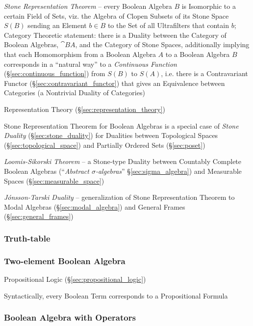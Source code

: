 \emph{Stone Representation Theorem} -- every Boolean Algebra $B$ is Isomorphic
to a certain Field of Sets, viz. the Algebra of Clopen Subsets of its Stone
Space $\xspace{S}(B)$ sending an Element $b \in B$ to the Set of all
Ultrafilters that contain $b$; Category Theoretic statement: there is a Duality
between the Category of Boolean Algebras, $\cat{BA}$, and the Category of Stone
Spaces, additionally implying that each Homomorphism from a Boolean Algebra $A$
to a Boolean Algebra $B$ corresponds in a ``natural way'' to a \emph{Continuous
  Function} (\S\ref{sec:continuous_function}) from $S(B)$ to $S(A)$, i.e. there
is a Contravariant Functor (\S\ref{sec:contravariant_functor}) that gives an
Equivalence between Categories (a Nontrivial Duality of Categories)

\fist Representation Theory (\S\ref{sec:representation_theory})

\fist Stone Representation Theorem for Boolean Algebras is a special case of
\emph{Stone Duality} (\S\ref{sec:stone_duality}) for Dualities between
Topological Spaces (\S\ref{sec:topological_space}) and Partially Ordered Sets
(\S\ref{sec:poset})

\emph{Loomis-Sikorski Theorem} -- a Stone-type Duality between Countably
Complete Boolean Algebras (``\emph{Abstract $\sigma$-algebras}''
\S\ref{sec:sigma_algebra}) and Measurable Spaces (\S\ref{sec:measurable_space})

\fist \emph{J\'onsson-Tarski Duality} --
generalization of Stone Representation Theorem to Modal Algebras
(\S\ref{sec:modal_algebra}) and General Frames (\S\ref{sec:general_frames})



\subsubsection{Truth-table}\label{sec:truth_table}

\subsubsection{Two-element Boolean Algebra}\label{sec:twoelement_boolean}

Propositional Logic (\S\ref{sec:propositional_logic})

Syntactically, every Boolean Term corresponds to a Propositional
Formula



\subsubsection{Boolean Algebra with Operators}\label{sec:boolean_with_operators}

